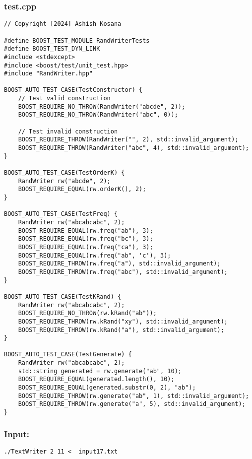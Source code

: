 \documentclass[12pt]{article}
\begin{document}
\subsubsection{test.cpp}
\begin{lstlisting}[style=cppcode]
// Copyright [2024] Ashish Kosana

#define BOOST_TEST_MODULE RandWriterTests
#define BOOST_TEST_DYN_LINK
#include <stdexcept>
#include <boost/test/unit_test.hpp>
#include "RandWriter.hpp"

BOOST_AUTO_TEST_CASE(TestConstructor) {
    // Test valid construction
    BOOST_REQUIRE_NO_THROW(RandWriter("abcde", 2));
    BOOST_REQUIRE_NO_THROW(RandWriter("abc", 0));

    // Test invalid construction
    BOOST_REQUIRE_THROW(RandWriter("", 2), std::invalid_argument);
    BOOST_REQUIRE_THROW(RandWriter("abc", 4), std::invalid_argument);
}

BOOST_AUTO_TEST_CASE(TestOrderK) {
    RandWriter rw("abcde", 2);
    BOOST_REQUIRE_EQUAL(rw.orderK(), 2);
}

BOOST_AUTO_TEST_CASE(TestFreq) {
    RandWriter rw("abcabcabc", 2);
    BOOST_REQUIRE_EQUAL(rw.freq("ab"), 3);
    BOOST_REQUIRE_EQUAL(rw.freq("bc"), 3);
    BOOST_REQUIRE_EQUAL(rw.freq("ca"), 3);
    BOOST_REQUIRE_EQUAL(rw.freq("ab", 'c'), 3);
    BOOST_REQUIRE_THROW(rw.freq("a"), std::invalid_argument);
    BOOST_REQUIRE_THROW(rw.freq("abc"), std::invalid_argument);
}

BOOST_AUTO_TEST_CASE(TestKRand) {
    RandWriter rw("abcabcabc", 2);
    BOOST_REQUIRE_NO_THROW(rw.kRand("ab"));
    BOOST_REQUIRE_THROW(rw.kRand("xy"), std::invalid_argument);
    BOOST_REQUIRE_THROW(rw.kRand("a"), std::invalid_argument);
}

BOOST_AUTO_TEST_CASE(TestGenerate) {
    RandWriter rw("abcabcabc", 2);
    std::string generated = rw.generate("ab", 10);
    BOOST_REQUIRE_EQUAL(generated.length(), 10);
    BOOST_REQUIRE_EQUAL(generated.substr(0, 2), "ab");
    BOOST_REQUIRE_THROW(rw.generate("ab", 1), std::invalid_argument);
    BOOST_REQUIRE_THROW(rw.generate("a", 5), std::invalid_argument);
}

\end{lstlisting}
\subsubsection{Input:}
\begin{lstlisting}[style=cppcode]
./TextWriter 2 11 <  input17.txt
\end{lstlisting}
\end{document}
